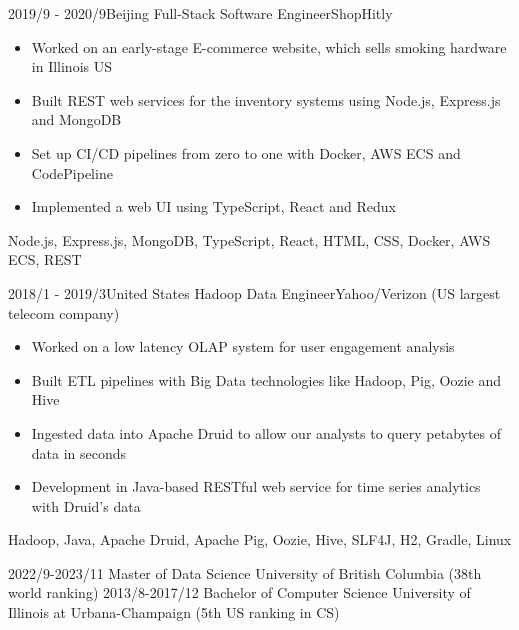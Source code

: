 \documentclass[localFont,alternative]{resume_template}
\begin{document}
\begin{experiences}
    \emptySeparator

    \experience
    {2019/9 - 2020/9}{Beijing}
    {Full-Stack Software Engineer}{ShopHitly}
    {
        \begin{itemize}
        \item Worked on an early-stage E-commerce website, which sells smoking hardware in Illinois US
        \item Built REST web services for the inventory systems using Node.js, Express.js and MongoDB
        \item Set up CI/CD pipelines from zero to one with Docker, AWS ECS and CodePipeline
        \item Implemented a web UI using TypeScript, React and Redux
        \end{itemize}
    }
    {Node.js, Express.js, MongoDB, TypeScript, React, HTML, CSS, Docker, AWS ECS, REST}

    \emptySeparator

    \experience
    {2018/1 - 2019/3}{United States}
    {Hadoop Data Engineer}{Yahoo/Verizon (US largest telecom company)}
    {
        \begin{itemize}
        \item Worked on a low latency OLAP system for user engagement analysis
        \item Built ETL pipelines with Big Data technologies like Hadoop, Pig, Oozie and Hive
        \item Ingested data into Apache Druid to allow our analysts to query petabytes of data in seconds
        \item Development in Java-based RESTful web service for time series analytics with Druid's data
        \end{itemize}
    }
    {Hadoop, Java, Apache Druid, Apache Pig, Oozie, Hive, SLF4J, H2, Gradle, Linux}

    \end{experiences}

    \begin{experiences}
    \degree
    {2022/9-2023/11}
    {Master of Data Science}
    {University of British Columbia (38th world ranking)}
    \vspace{6pt}
    \degree
    {2013/8-2017/12}
    {Bachelor of Computer Science}
    {University of Illinois at Urbana-Champaign (5th US ranking in CS)}
    \end{experiences}
\end{document}
